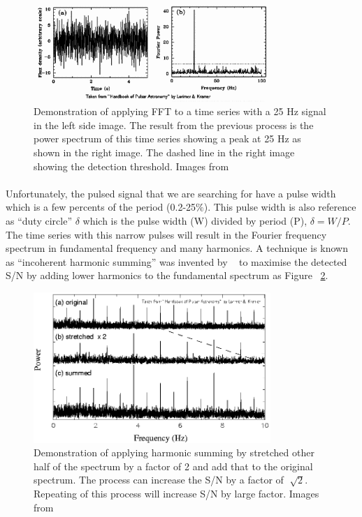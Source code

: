 \documentclass[thesis_msc.tex]{subfiles}
\begin{document}
 \begin{figure}[h]
\centering
\includegraphics[width=0.80\textwidth]{figures/FFT}
\caption{Demonstration of applying FFT to a time series with a 25 Hz signal in the left side image. The result from the previous process is the power spectrum of this time series showing a peak at 25 Hz as shown in the right image. The dashed line in the right image showing the detection threshold. Images from ~\citep{handbook}}
\label{FFT_im}
\end{figure}
\paragraph{} Unfortunately, the pulsed signal that we are searching for have a pulse width which is a few percents of the period (0.2-25$\%$). This pulse width is also reference as ``duty circle'' $\delta$ which is the pulse width (W) divided by period (P), $\delta=W/P$. The time series with this narrow pulses will result in the Fourier frequency spectrum in fundamental frequency and many harmonics. A technique is known as ``incoherent harmonic summing'' was invented by ~\cite{taylor1969two} to maximise the detected S/N by adding lower harmonics to the fundamental spectrum as Figure ~\ref{FFT_ham}.

 \begin{figure}[h]
\centering
\includegraphics[width=0.8\textwidth]{figures/6_06.png}
\caption{Demonstration of applying harmonic summing by stretched other half of the spectrum by a factor of 2 and add that to the original spectrum. The process can increase the S/N by a factor of $\sqrt[]{2}$. Repeating of this process will increase S/N by large factor. Images from ~\citep{handbook}}
\label{FFT_ham}
\end{figure}
\end{document}
